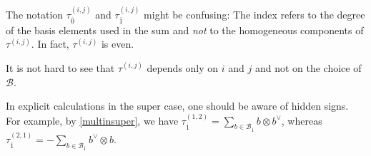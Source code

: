 \documentclass[a4paper,11pt]{amsart}
\let\ov\overline
\newcommand\cB{\mathcal{B}}
\numberwithin{equation}{subsection}
\theoremstyle{definition}
\theoremstyle{theorem}
\theoremstyle{remark}
\begin{document}
   \begin{Remark}The notation $\tau^{(i,j)}_{\ov0}$ and $\tau^{(i,j)}_{\ov1}$  might be confusing: The index refers to the degree of the basis elements used in the sum and \emph{not} to the homogeneous components of $\tau^{(i,j)}$. In fact, $\tau^{(i,j)}$ is even.
   \end{Remark}
\begin{Remark}\label{hiddensigns}
It is not hard to see
  that $\tau^{(i,j)}$ depends only on $i$ and $j$ and not on the choice
  of $\cB$.

  In explicit calculations in the super case, one should be aware of hidden
  signs. For example, by \autoref{multinsuper}, we have
$\tau^{(1,2)}_{\ov{1}}=\sum_{b\in\cB_{\ov{1}}}b \otimes b^{\vee}$, whereas $\tau^{(2,1)}_{\ov{1}}=-\sum_{b\in\cB_{\ov{1}}}b^{\vee} \otimes b$.
 \end{Remark}
\end{document}
